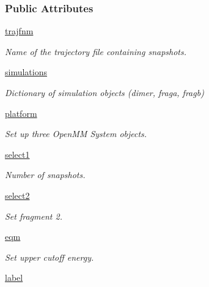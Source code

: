 \subsubsection*{Public Attributes}
\begin{DoxyCompactItemize}
\item 
\hyperlink{classforcebalance_1_1openmmio_1_1Interaction__OpenMM_a0ea6f8e123f0120022c750e91121b178}{trajfnm}
\begin{DoxyCompactList}\small\item\em Name of the trajectory file containing snapshots. \end{DoxyCompactList}\item 
\hyperlink{classforcebalance_1_1openmmio_1_1Interaction__OpenMM_a914baf305ebbafd362e9b2ddfb69f7e7}{simulations}
\begin{DoxyCompactList}\small\item\em Dictionary of simulation objects (dimer, fraga, fragb) \end{DoxyCompactList}\item 
\hyperlink{classforcebalance_1_1openmmio_1_1Interaction__OpenMM_a2cb5810aea0daabf203c7f343954c161}{platform}
\begin{DoxyCompactList}\small\item\em Set up three Open\-M\-M System objects. \end{DoxyCompactList}\item 
\hyperlink{classforcebalance_1_1interaction_1_1Interaction_a22c4a698eb3bf91187894fdce874e8d5}{select1}
\begin{DoxyCompactList}\small\item\em Number of snapshots. \end{DoxyCompactList}\item 
\hyperlink{classforcebalance_1_1interaction_1_1Interaction_acbdfffa2596af6c90adf0bfe071d2205}{select2}
\begin{DoxyCompactList}\small\item\em Set fragment 2. \end{DoxyCompactList}\item 
\hyperlink{classforcebalance_1_1interaction_1_1Interaction_a4e609a6bd7e9a0852622ecc4ca5537d1}{eqm}
\begin{DoxyCompactList}\small\item\em Set upper cutoff energy. \end{DoxyCompactList}\item 
\hyperlink{classforcebalance_1_1interaction_1_1Interaction_a35a5c40d99a474bbf6032888f1f75e46}{label}

\end{DoxyCompactItemize}
